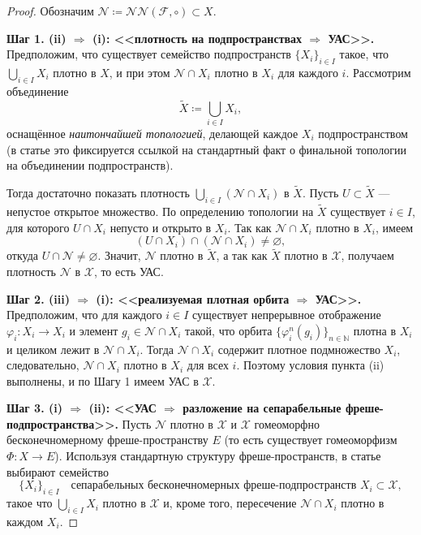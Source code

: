 \documentclass[../NDCNNAI_main.tex]{subfiles}
\begin{document}
\begin{proof}
Обозначим $\mathcal{N} \coloneq \mathcal{NN}(\mathcal{F},\circ) \subset X$.

\noindent\textbf{Шаг 1. (ii) $\Rightarrow$ (i): <<плотность на подпространствах $\Rightarrow$ УАС>>.}
Предположим, что существует семейство подпространств $\{X_i\}_{i\in I}$ такое, что
$\bigcup_{i\in I} X_i$ плотно в $X$, и при этом $\mathcal{N}\cap X_i$ плотно в $X_i$ для каждого $i$.
Рассмотрим объединение
\[
\widetilde{X} \coloneq \bigcup_{i\in I} X_i,
\]
оснащённое \emph{наитончайшей топологией}, делающей каждое $X_i$ подпространством
(в статье это фиксируется ссылкой на стандартный факт о финальной топологии на объединении
подпространств).

Тогда достаточно показать плотность $\bigcup_{i\in I}(\mathcal{N}\cap X_i)$ в $\widetilde{X}$.
Пусть $U\subset \widetilde{X}$ --- непустое открытое множество. По определению топологии на
$\widetilde{X}$ существует $i\in I$, для которого $U\cap X_i$ непусто и открыто в $X_i$.
Так как $\mathcal{N}\cap X_i$ плотно в $X_i$, имеем
\[
(U\cap X_i)\cap(\mathcal{N}\cap X_i)\neq\varnothing,
\]
откуда $U\cap \mathcal{N}\neq\varnothing$. Значит, $\mathcal{N}$ плотно в $\widetilde{X}$, а так как
$\widetilde{X}$ плотно в $\mathcal{X}$, получаем плотность $\mathcal{N}$ в $\mathcal{X}$, то есть УАС.

\noindent\textbf{Шаг 2. (iii) $\Rightarrow$ (i): <<реализуемая плотная орбита $\Rightarrow$ УАС>>.}
Предположим, что для каждого $i\in I$ существует непрерывное отображение
$\varphi_i:X_i\to X_i$ и элемент $g_i\in \mathcal{N}\cap X_i$ такой, что орбита
$\{\varphi_i^n(g_i)\}_{n\in\mathbb{N}}$ плотна в $X_i$ и целиком лежит в $\mathcal{N}\cap X_i$.
Тогда $\mathcal{N}\cap X_i$ содержит плотное подмножество $X_i$, следовательно,
$\mathcal{N}\cap X_i$ плотно в $X_i$ для всех $i$. Поэтому условия пункта (ii) выполнены,
и по Шагу 1 имеем УАС в $\mathcal{X}$.

\noindent\textbf{Шаг 3. (i) $\Rightarrow$ (ii): <<УАС $\Rightarrow$ разложение на сепарабельные фреше-подпространства>>.}
Пусть $\mathcal{N}$ плотно в $\mathcal{X}$ и $\mathcal{X}$ гомеоморфно бесконечномерному фреше-пространству $E$
(то есть существует гомеоморфизм $\Phi\colon X\to E$).
Используя стандартную структуру фреше-пространств, в статье выбирают семейство
\[
\{X_i\}_{i\in I}\quad\text{сепарабельных бесконечномерных фреше-подпространств }X_i\subset \mathcal{X},
\]
такое что $\bigcup_{i\in I}X_i$ плотно в $\mathcal{X}$ и, кроме того, пересечение $\mathcal{N}\cap X_i$
плотно в каждом $X_i$.


\end{proof}
\end{document}

